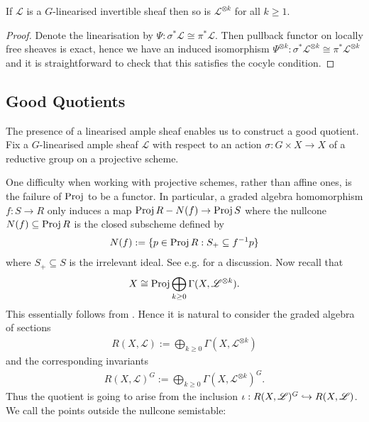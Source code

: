 \documentclass[12pt]{ociamthesis}  %
\begin{document}
\begin{lemma}
  If $\mathscr L$ is a $G$-linearised invertible sheaf then so is
  $\mathscr L^{\otimes k}$ for all $k\geq 1$.
  \begin{proof}
    Denote the linearisation by $\Psi : \sigma^*\mathscr L \cong \pi^*\mathscr
      L$.  Then pullback functor on locally free sheaves is exact, hence we have
    an induced isomorphism $\Psi^{\otimes k} : \sigma^*\mathscr L^{\otimes k}
      \cong \pi^*\mathscr L^{\otimes k}$ and it is straightforward to check that
    this satisfies the cocyle condition.
  \end{proof}
\end{lemma}

\subsection{Good Quotients}

The presence of a linearised ample sheaf enables us to construct a good
quotient.  Fix a $G$-linearised ample sheaf $\mathscr L$ with respect to an
action $\sigma : G\times X\to X$ of a reductive group on a projective scheme.

One difficulty when working with projective schemes, rather
than affine ones, is the failure of $\operatorname{Proj}$ to be a functor. In particular,
a graded algebra homomorphism $f : S \to R$ only induces a map
$\operatorname{Proj} R - N(f) \to \operatorname{Proj} S$ where the nullcone $N(f)\subseteq\operatorname{Proj} R$ is the closed
subscheme defined by
\begin{align*}
  N(f) := \{ p \in \operatorname{Proj} R : S_+ \subseteq f^{-1}p\}
\end{align*}
where $S_+\subseteq S$ is the irrelevant ideal. See e.g.
\cite[Remark 13.7]{gortz2010} for a discussion. Now recall that
\begin{align*}
  X \cong \operatorname{Proj}\bigoplus_{k\geq 0}\Gamma(X,\mathscr L^{\otimes k}).
\end{align*}
This essentially follows from \cite[Proposition 13.48]{gortz2010}. Hence
it is natural to consider the graded algebra of sections
\begin{align*}
  R(X,\mathscr L) := \bigoplus_{k\geq 0}\Gamma(X,\mathscr L^{\otimes k})
\end{align*}
and the corresponding invariants
\begin{align*}
  R(X,\mathscr L)^G := \bigoplus_{k\geq 0}\Gamma(X,\mathscr L^{\otimes k})^G.
\end{align*}
Thus the quotient is going to arise from the inclusion
$\iota : R(X,\mathscr L)^G\hookrightarrow R(X,\mathscr L)$. We call the points outside the nullcone
semistable:
\end{document}
